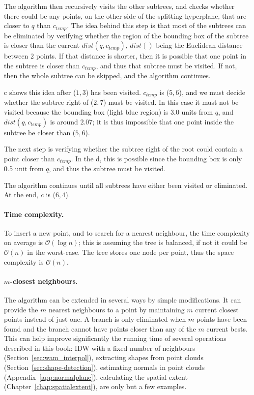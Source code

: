 The algorithm then recursively visits the other subtrees, and checks whether there could be any points, on the other side of the splitting hyperplane, that are closer to $q$ than $c_{temp}$.
The idea behind this step is that most of the subtrees can be eliminated by verifying whether the region of the bounding box of the subtree is closer than the current $dist(q, c_{temp})$, $dist()$ being the Euclidean distance between 2 points.
If that distance is shorter, then it is possible that one point in the subtree is closer than $c_{temp}$, and thus that subtree must be visited. 
If not, then the whole subtree can be skipped, and the algorithm continues.

c shows this idea after ($1,3$) has been visited.
$c_{temp}$ is ($5,6$), and we must decide whether the subtree right of ($2,7$) must be visited.
In this case it must not be visited because the bounding box (light blue region) is 3.0 units from $q$, and $dist(q,c_{temp})$ is around 2.07; it is thus impossible that one point inside the subtree be closer than ($5,6$).

The next step is verifying whether the subtree right of the root could contain a point closer than $c_{temp}$.
In the d, this is possible since the bounding box is only 0.5 unit from $q$, and thus the subtree must be visited.

The algorithm continues until all subtrees have either been visited or eliminated.
At the end, $c$ is ($6,4$).


\paragraph{Time complexity.}
To insert a new point, and to search for a nearest neighbour, the time complexity on average is $\mathcal{O}(\log n)$; this is assuming the tree is balanced, if not it could be $\mathcal{O}(n)$ in the worst-case.
The tree stores one node per point, thus the space complexity is $\mathcal{O}(n)$.

\paragraph{$m$-closest neighbours.}%
\label{sec:knn-m}

The algorithm can be extended in several ways by simple modifications. 
It can provide the $m$ nearest neighbours to a point by maintaining $m$ current closest points instead of just one. 
A branch is only eliminated when $m$ points have been found and the branch cannot have points closer than any of the $m$ current bests. 
This can help improve significantly the running time of several operations described in this book: IDW with a fixed number of neighbours (Section~\ref{sec:wam_interpol}), extracting shapes from point clouds (Section~\ref{sec:shape-detection}), estimating normals in point clouds (Appendix~\ref{app:normalplane}), calculating the spatial extent (Chapter~\ref{chap:spatialextent}), are only but a few examples.

